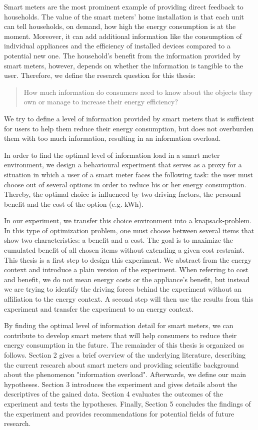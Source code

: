 Smart meters are the most prominent example of providing direct feedback to households. The value of the smart meters' home installation is that each unit can tell households, on demand, how high the energy consumption is at the moment. Moreover, it can add additional information like the consumption of individual appliances and the efficiency of installed devices compared to a potential new one. The household's benefit from the information provided by smart meters, however, depends on whether the information is tangible to the user.
Therefore, we define the research question for this thesis:
\begin{quotation}
How much information do consumers need to know about the objects they own or manage to increase their energy efficiency? 
\end{quotation}
We try to define a level of information provided by smart meters that is sufficient for users to help them reduce their energy consumption, but does not overburden them with too much information, resulting in an information overload.

In order to find the optimal level of information load in a smart meter environment, we design a behavioural experiment that serves as a proxy for a situation in which a user of a smart meter faces the following task: the user must choose out of several options in order to reduce his or her energy consumption. Thereby, the optimal choice is influenced by two driving factors, the personal benefit and the cost of the option (e.g. kWh).

In our experiment, we transfer this choice environment into a knapsack-problem. In this type of optimization problem, one must choose between several items that show two characteristics: a benefit and a cost. The goal is to maximize the cumulated benefit of all chosen items without extending a given cost restraint. This thesis is a first step to design this experiment. We abstract from the energy context and introduce a plain version of the experiment. When referring to cost and benefit, we do not mean energy costs or the appliance's benefit, but instead we are trying to identify the driving forces behind the experiment without an affiliation to the energy context. A second step will then use the results from this experiment and transfer the experiment to an energy context.
 
By finding the optimal level of information detail for smart meters, we can contribute to develop smart meters that will help consumers to reduce their energy consumption in the future. The remainder of this thesis is organized as follows. Section 2 gives a brief overview of the underlying literature, describing the current research about smart meters and providing scientific background about the phenomenon "information overload". Afterwards, we define our main hypotheses.
Section 3 introduces the experiment and gives details about the descriptives of the gained data. Section 4 evaluates the outcomes of the experiment and tests the hypotheses. Finally, Section 5 concludes the findings of the experiment and provides recommendations for potential fields of future research.